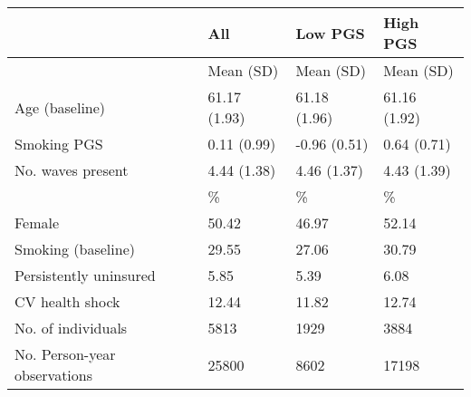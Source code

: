 % 
\begin{tabular}{llll}
  \toprule
\textbf{ } & \textbf{ All } & \textbf{ Low PGS } & \textbf{ High PGS } \\ 
  \midrule
 & Mean (SD) & Mean (SD) & Mean (SD) \\ 
   \midrule
Age (baseline) & 61.17 (1.93) & 61.18 (1.96) & 61.16 (1.92) \\ 
  Smoking PGS & 0.11 (0.99) & -0.96 (0.51) & 0.64 (0.71) \\ 
  No. waves present & 4.44 (1.38) & 4.46 (1.37) & 4.43 (1.39) \\ 
   & \% & \% & \% \\ 
  Female & 50.42 & 46.97 & 52.14 \\ 
  Smoking (baseline) & 29.55 & 27.06 & 30.79 \\ 
  Persistently uninsured & 5.85 & 5.39 & 6.08 \\ 
  CV health shock & 12.44 & 11.82 & 12.74 \\ 
   \midrule
No. of individuals & 5813 & 1929 & 3884 \\ 
  No. Person-year observations & 25800 & 8602 & 17198 \\ 
   \bottomrule
\end{tabular}
